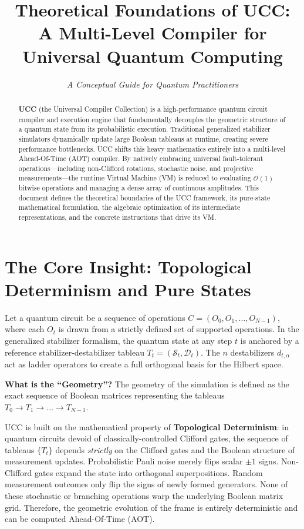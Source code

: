 \documentclass[11pt]{article}
\title{\textbf{Theoretical Foundations of UCC: \\ A Multi-Level Compiler for Universal Quantum Computing}}
\author{\textit{A Conceptual Guide for Quantum Practitioners}}
\date{}
\begin{document}
\maketitle

\begin{abstract}
\noindent \textbf{UCC} (the Universal Compiler Collection) is a high-performance quantum circuit compiler and execution engine that fundamentally decouples the geometric structure of a quantum state from its probabilistic execution. Traditional generalized stabilizer simulators dynamically update large Boolean tableaus at runtime, creating severe performance bottlenecks. UCC shifts this heavy mathematics entirely into a multi-level Ahead-Of-Time (AOT) compiler. By natively embracing universal fault-tolerant operations—including non-Clifford rotations, stochastic noise, and projective measurements—the runtime Virtual Machine (VM) is reduced to evaluating $\mathcal{O}(1)$ bitwise operations and managing a dense array of continuous amplitudes. This document defines the theoretical boundaries of the UCC framework, its pure-state mathematical formulation, the algebraic optimization of its intermediate representations, and the concrete instructions that drive its VM.
\end{abstract}

\vspace{0.5cm}

\section{The Core Insight: Topological Determinism and Pure States}

Let a quantum circuit be a sequence of operations $C = (O_0, O_1, \dots, O_{N-1})$, where each $O_t$ is drawn from a strictly defined set of supported operations. In the generalized stabilizer formalism, the quantum state at any step $t$ is anchored by a reference stabilizer-destabilizer tableau $T_t = (\mathcal{S}_t, \mathcal{D}_t)$. The $n$ destabilizers $d_{t,\alpha}$ act as ladder operators to create a full orthogonal basis for the Hilbert space.

\textbf{What is the ``Geometry''?} The geometry of the simulation is defined as the exact sequence of Boolean matrices representing the tableaus $T_0 \to T_1 \to \dots \to T_{N-1}$.

UCC is built on the mathematical property of \textbf{Topological Determinism}: in quantum circuits devoid of classically-controlled Clifford gates, the sequence of tableaus $\{T_t\}$ depends \textit{strictly} on the Clifford gates and the Boolean structure of measurement updates. Probabilistic Pauli noise merely flips scalar $\pm 1$ signs. Non-Clifford gates expand the state into orthogonal superpositions. Random measurement outcomes only flip the signs of newly formed generators. None of these stochastic or branching operations warp the underlying Boolean matrix grid. Therefore, the geometric evolution of the frame is entirely deterministic and can be computed Ahead-Of-Time (AOT).
\end{document}
